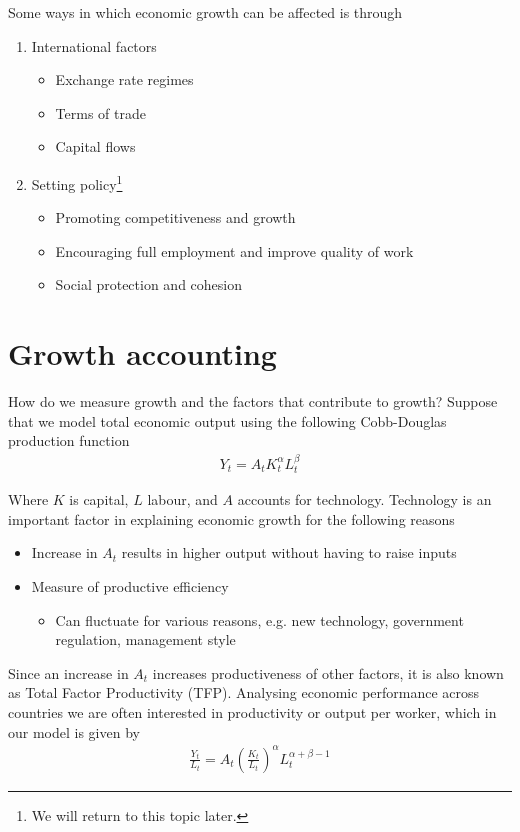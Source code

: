 \documentclass{tufte-handout}
\begin{document}
Some ways in which economic growth can be affected is through
\begin{enumerate}
  \item International factors
  \begin{itemize}
    \item Exchange rate regimes
    \item Terms of trade
    \item Capital flows
  \end{itemize}

  \item Setting policy\footnote{We will return to this topic later.}
  \begin{itemize}
    \item Promoting competitiveness and growth
    \item Encouraging full employment and improve quality of work
    \item Social protection and cohesion
  \end{itemize}  
\end{enumerate}

\section{Growth accounting}
How do we measure growth and the factors that contribute to growth? 
Suppose that we model total economic output using the following Cobb-Douglas production function
\begin{align*}
  Y_t=A_tK^{\alpha}_tL^{\beta}_t
\end{align*}

Where $K$ is capital, $L$ labour, and $A$ accounts for technology. 
Technology is an important factor in explaining economic growth for the following reasons
\begin{itemize}
  \item Increase in $A_t$ results in higher output without having to raise inputs
  \item Measure of productive efficiency
  \begin{itemize} 
    \item Can fluctuate for various reasons, e.g. new technology, government regulation, management style
  \end{itemize}
\end{itemize}

Since an increase in $A_t$ increases productiveness of other factors, it is also known as Total Factor Productivity (TFP).
Analysing economic performance across countries we are often interested in productivity or output per worker, which in our model is given by
\begin{align*}
  \frac{Y_t}{L_t}= A_t \left(\frac{K_t}{L_t} \right)^{\alpha}L_t^{\alpha + \beta -1}
\end{align*}
\end{document}
